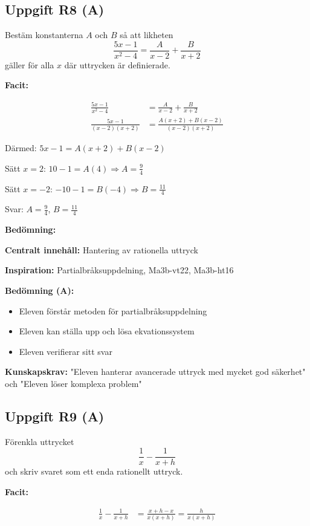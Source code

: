 \documentclass[12pt]{article}
\begin{document}
\subsection*{Uppgift R8 (A)}
Bestäm konstanterna $A$ och $B$ så att likheten
\[
\frac{5x - 1}{x^2 - 4} = \frac{A}{x - 2} + \frac{B}{x + 2}
\]
gäller för alla $x$ där uttrycken är definierade.

\begin{facitbox}
\textbf{Facit:}

\begin{align*}
\frac{5x - 1}{x^2 - 4} &= \frac{A}{x - 2} + \frac{B}{x + 2} \\
\frac{5x - 1}{(x - 2)(x + 2)} &= \frac{A(x + 2) + B(x - 2)}{(x - 2)(x + 2)}
\end{align*}

Därmed: $5x - 1 = A(x + 2) + B(x - 2)$

Sätt $x = 2$: $10 - 1 = A(4) \Rightarrow A = \frac{9}{4}$

Sätt $x = -2$: $-10 - 1 = B(-4) \Rightarrow B = \frac{11}{4}$

Svar: $A = \frac{9}{4}$, $B = \frac{11}{4}$
\end{facitbox}

\begin{refbox}
\textbf{Bedömning:}

\textbf{Centralt innehåll:} Hantering av rationella uttryck

\textbf{Inspiration:} Partialbråksuppdelning, Ma3b-vt22, Ma3b-ht16

\textbf{Bedömning (A):}
\begin{itemize}
    \item Eleven förstår metoden för partialbråksuppdelning
    \item Eleven kan ställa upp och lösa ekvationssystem
    \item Eleven verifierar sitt svar
\end{itemize}

\textbf{Kunskapskrav:} "Eleven hanterar avancerade uttryck med mycket god säkerhet" och "Eleven löser komplexa problem"
\end{refbox}

\subsection*{Uppgift R9 (A)}
Förenkla uttrycket
\[
\frac{1}{x} - \frac{1}{x + h}
\]
och skriv svaret som ett enda rationellt uttryck.

\begin{facitbox}
\textbf{Facit:}

\begin{align*}
\frac{1}{x} - \frac{1}{x + h} &= \frac{x + h - x}{x(x + h)} = \frac{h}{x(x + h)}
\end{align*}
\end{facitbox}
\end{document}
